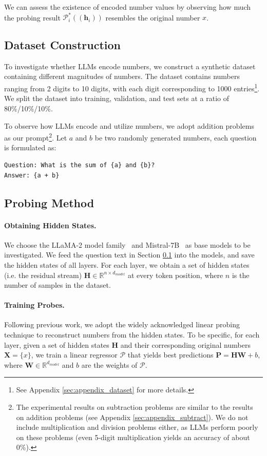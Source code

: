 \documentclass[11pt]{article}
\begin{document}
We can assess the existence of encoded number values by observing how much the probing result $\mathcal{P}_{i}^{*}((\mathbf{h}_i))$ resembles the original number $x$.

\subsection{Dataset Construction}
\label{sec:dataset}
To investigate whether LLMs encode numbers, we construct a synthetic dataset containing different magnitudes of numbers.
The dataset contains numbers ranging from 2 digits to 10 digits, with each digit corresponding to 1000 entries\footnote{See Appendix \ref{sec:appendix_dataset} for more details.}.
We split the dataset into training, validation, and test sets at a ratio of 80\%/10\%/10\%.

To observe how LLMs encode and utilize numbers, we adopt addition problems as our prompt\footnote{The experimental results on subtraction problems are similar to the results on addition problems (see Appendix \ref{sec:appendix_subtract}). We do not include multiplication and division problems either, as LLMs perform poorly on these problems (even 5-digit multiplication yields an accuracy of about 0\%).}.
Let $a$ and $b$ be two randomly generated numbers, each question is formulated as:
\begin{verbatim}
Question: What is the sum of {a} and {b}? 
Answer: {a + b}
\end{verbatim}

\subsection{Probing Method}
\label{sec:probing}
\paragraph{Obtaining Hidden States.}
We choose the LLaMA-2 model family~\cite{touvron2023llama2} and Mistral-7B~\cite{jiang2023mistral} as base models to be investigated.
We feed the question text in Section \ref{sec:dataset} into the models, and save the hidden states of all layers.
For each layer, we obtain a set of hidden states (i.e. the residual stream) $\mathbf{H} \in \mathbb{R}^{n \times d_{model}}$ at every token position, where $n$ is the number of samples in the dataset. 

\paragraph{Training Probes.}
Following previous work, we adopt the widely acknowledged linear probing technique to reconstruct numbers from the hidden states.
To be specific, for each layer, given a set of hidden states $\mathbf{H}$ and their corresponding original numbers $\mathbf{X} = \{x\}$, we train a linear regressor $\mathcal{P}$ that yields best predictions $\mathbf{P} = \mathbf{H}\mathbf{W} + b$, where $\mathbf{W} \in \mathbb{R}^{d_{model}}$ and $b$ are the weights of $\mathcal{P}$.
\end{document}
